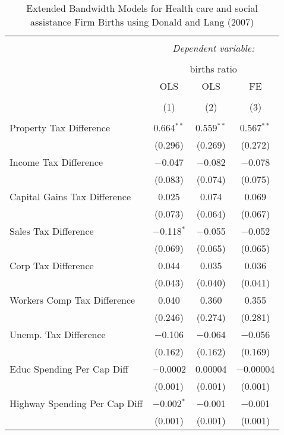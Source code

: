 
\begin{table}[!htbp] \centering 
  \caption{Extended Bandwidth Models for  Health care and social assistance Firm Births using Donald and Lang (2007)} 
  \label{} 
\begin{tabular}{@{\extracolsep{5pt}}lccc} 
\\[-1.8ex]\hline 
\hline \\[-1.8ex] 
 & \multicolumn{3}{c}{\textit{Dependent variable:}} \\ 
\cline{2-4} 
\\[-1.8ex] & \multicolumn{3}{c}{births ratio} \\ 
 & OLS & OLS & FE \\ 
\\[-1.8ex] & (1) & (2) & (3)\\ 
\hline \\[-1.8ex] 
 Property Tax Difference & 0.664$^{**}$ & 0.559$^{**}$ & 0.567$^{**}$ \\ 
  & (0.296) & (0.269) & (0.272) \\ 
  Income Tax Difference & $-$0.047 & $-$0.082 & $-$0.078 \\ 
  & (0.083) & (0.074) & (0.075) \\ 
  Capital Gains Tax Difference & 0.025 & 0.074 & 0.069 \\ 
  & (0.073) & (0.064) & (0.067) \\ 
  Sales Tax Difference & $-$0.118$^{*}$ & $-$0.055 & $-$0.052 \\ 
  & (0.069) & (0.065) & (0.065) \\ 
  Corp Tax Difference & 0.044 & 0.035 & 0.036 \\ 
  & (0.043) & (0.040) & (0.041) \\ 
  Workers Comp Tax Difference & 0.040 & 0.360 & 0.355 \\ 
  & (0.246) & (0.274) & (0.281) \\ 
  Unemp. Tax Difference & $-$0.106 & $-$0.064 & $-$0.056 \\ 
  & (0.162) & (0.162) & (0.169) \\ 
  Educ Spending Per Cap Diff & $-$0.0002 & 0.00004 & $-$0.00004 \\ 
  & (0.001) & (0.001) & (0.001) \\ 
  Highway Spending Per Cap Diff & $-$0.002$^{*}$ & $-$0.001 & $-$0.001 \\ 
  & (0.001) & (0.001) & (0.001) \\ 

\end{tabular}
\end{table}
